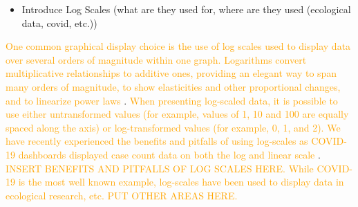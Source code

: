 \documentclass[]{interact}
\theoremstyle{plain}%
\theoremstyle{definition}
\theoremstyle{remark}
\def\tightlist{}
\begin{document}
\begin{itemize}
\tightlist
\item
  Introduce Log Scales (what are they used for, where are they used
  (ecological data, covid, etc.))
\end{itemize}

\textcolor{Orange}{One common graphical display choice is the use of log scales used to display data over several orders of magnitude within one graph. Logarithms convert multiplicative relationships to additive ones, providing an elegant way to span many orders of magnitude, to show elasticities and other proportional changes, and to linearize power laws}
\citep{menge_logarithmic_2018}.
\textcolor{Orange}{When presenting log-scaled data, it is possible to use either untransformed values (for example, values of 1, 10 and 100 are equally spaced along the axis) or log-transformed values (for example, 0, 1, and 2). We have recently experienced the benefits and pitfalls of using log-scales as COVID-19 dashboards displayed case count data on both the log and linear scale}
\citep{wade_fagen_ulmschneider_2020}.
\textcolor{Orange}{INSERT BENEFITS AND PITFALLS OF LOG SCALES HERE. While COVID-19 is the most well known example, log-scales have been used to display data in ecological research, etc. PUT OTHER AREAS HERE.}
\end{document}
